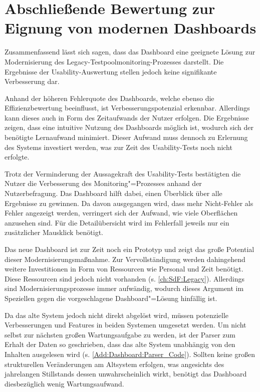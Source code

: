 \section{Abschließende Bewertung zur Eignung von modernen Dash\-boards}
\label{ch:Diskussion:Abschließende_Bewertung}

Zusammenfassend lässt sich sagen, dass das Dash\-board eine geeignete Lösung zur Modernisierung des Legacy-Testpoolmonitoring-Prozesses darstellt. Die Ergebnisse der Usability-Auswertung stellen jedoch keine signifikante Verbesserung dar.

Anhand der höheren Fehlerquote des Dash\-boards, welche ebenso die Effizienzbewertung beeinflusst, ist Verbesserungspotenzial erkennbar. Allerdings kann dieses auch in Form des Zeitaufwands der Nutzer erfolgen. Die Ergebnisse zeigen, dass eine intuitive Nutzung des Dash\-boards möglich ist, wodurch sich der benötigte Lernaufwand minimiert. Dieser Aufwand muss dennoch zu Erlernung des Systems investiert werden, was zur Zeit des Usability-Tests noch nicht erfolgte.

Trotz der Verminderung der Aussagekraft des Usability-Tests bestätigten die Nutzer die Verbesserung des Monitoring"=Prozesses anhand der Nutzerbefragung. Das Dash\-board hilft dabei, einen Überblick über alle Ergebnisse zu gewinnen. Da davon ausgegangen wird, dass mehr Nicht-Fehler als Fehler angezeigt werden, verringert sich der Aufwand, wie viele Oberflächen anzusehen sind. Für die Detailübersicht wird im Fehlerfall jeweils nur ein zusätzlicher  Mausklick benötigt.

Das neue Dashboard ist zur Zeit noch ein Prototyp und zeigt das große Potential dieser Modernisierungsmaßnahme. Zur Vervollständigung werden dahingehend weitere Investitionen in Form von Ressourcen wie Personal und Zeit benötigt. Diese Ressourcen sind jedoch nicht vorhanden (s. \autoref{ch:SdF:Legacy}). Allerdings sind Modernisierungsprozesse immer aufwändig, wodurch dieses Argument im Speziellen gegen die vorgeschlagene Dash\-board"=Lösung hinfällig ist.

Da das alte System jedoch nicht direkt abgelöst wird, müssen potenzielle Verbesserungen und Features in beiden Systemen umgesetzt werden. Um nicht selbst zur nächsten großen Wartungsaufgabe zu werden, ist der Parser zum Erhalt der Daten so geschrieben, dass das alte System unabhängig von den Inhalten ausgelesen wird (s. \autoref{Add:Dashboard:Parser_Code}). Sollten keine großen strukturellen Veränderungen am Altsystem erfolgen, was angesichts des jahrelangen Stillstands dessen unwahrscheinlich wirkt, benötigt das Dash\-board diesbezüglich wenig Wartungsaufwand.

